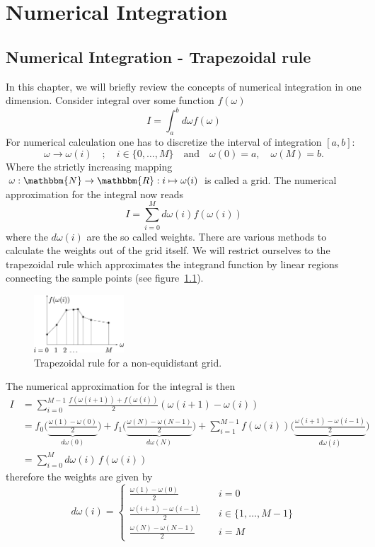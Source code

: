 \chapter{Numerical Integration}\label{chapter:numerical_integraion}
\section{Numerical Integration - Trapezoidal rule}
In this chapter, we will briefly review the concepts of numerical integration in one dimension. Consider integral over some function $f(\omega)$
\begin{equation}
	I=\int_a^b d\omega f(\omega)
\end{equation}
For numerical calculation one has to discretize the interval of integration $[a,b]$:
\[
	\omega \to \omega(i) \quad;\quad i\in\{0,\dots,M\}\quad\text{and}\quad \omega(0)=a,\quad \omega(M)=b.
\]
Where the strictly increasing mapping $\omega: \mathbbm{N} \to \mathbbm{R}: i \mapsto \omega(i)$ is called a grid. The numerical approximation for the integral now reads
\begin{equation} 
	I=\sum_{i=0}^M d\omega(i) f(\omega(i))
\end{equation}
where the $d\omega(i)$ are the so called weights. There are various methods to calculate the weights out of the grid itself. We will restrict ourselves to the trapezoidal rule which approximates the integrand function by linear regions connecting the sample points (see figure~\ref{fig:trapezoidal_rule}).
\begin{figure}[ht]
	\centering
	\includegraphics[width=0.3\textwidth]{pics/trapez.eps}
	\caption{Trapezoidal rule for a non-equidistant grid.}
	\label{fig:trapezoidal_rule}
\end{figure}

The numerical approximation for the integral is then
\begin{align*}
	I&=\sum_{i=0}^{M-1} \frac{f(\omega(i+1)) + f(\omega(i))}{2} (\omega(i+1)-\omega(i)) \\
	&=f_0\biggl( \underbrace{\frac{\omega(1)-\omega(0)}{2}}_{d\omega(0)}\biggr) + f_1 \biggl( \underbrace{\frac{\omega(N)-\omega(N-1)}{2}}_{d\omega(N)}\biggr) + \sum_{i=1}^{M-1} f(\omega(i)) \biggl( \underbrace{\frac{\omega(i+1)-\omega(i-1)}{2}}_{d\omega(i)}\biggr)\\
	&=\sum_{i=0}^{M} d\omega(i)\,f(\omega(i))
\end{align*}
therefore the weights are given by
\[
	d\omega(i)=\begin{cases}
		\frac{\omega(1)-\omega(0)}{2} \quad &i=0\\
		\frac{\omega(i+1)-\omega(i-1)}{2} \quad &i\in \{1,\dots,M-1\}  \\
		\frac{\omega(N)-\omega(N-1)}{2} \quad &i=M
	\end{cases}
\]

